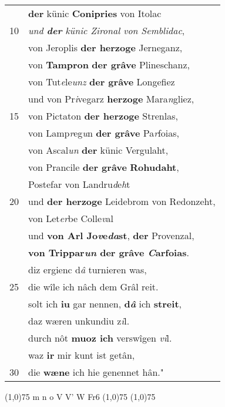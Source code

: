 \documentclass[8pt,a4paper,notitlepage]{article}
\begin{document}
\begin{table}[ht]
\begin{minipage}[t]{0.5\linewidth}
\begin{tabular}{rl}
 & \textbf{der} künic \textbf{Conipries} von Itolac\\ 
10 & \textit{und \textbf{der} künic Zironal von Semblidac},\\ 
 & von Jeroplis \textbf{der herzoge} Jerneganz,\\ 
 & von \textbf{Tampron} \textbf{der grâve} Plineschanz,\\ 
 & von Tut\textit{e}le\textit{unz} \textbf{der grâve} Longefiez\\ 
 & und von Pr\textit{i}vegarz \textbf{herzoge} Mara\textit{n}gliez,\\ 
15 & von Pictaton \textbf{der herzoge} Strenlas,\\ 
 & von Lamp\textit{r}eg\textit{u}n \textbf{der grâve} Pa\textit{r}foias,\\ 
 & von Ascal\textit{un} \textbf{der} künic Vergulaht,\\ 
 & von Prancile \textbf{der grâve} \textbf{Rohudaht},\\ 
 & Postefar von Landru\textit{d}e\textit{h}t\\ 
20 & und \textbf{der herzoge} Leidebrom von Redonzeht,\\ 
 & von Let\textit{er}be Colle\textit{v}al\\ 
 & und \textbf{von Arl Jo\textit{v}e\textit{da}st}, \textbf{der} Provenzal,\\ 
 & \textbf{von Trippar\textit{un} der grâve \textit{C}arfoias}.\\ 
 & diz ergienc d\textit{â} turnieren was,\\ 
25 & die wîle ich nâch dem Grâl reit.\\ 
 & solt ich \textbf{iu} gar nennen, \textbf{d\textit{â}} ich \textbf{streit},\\ 
 & daz wæren unkundiu z\textit{i}l.\\ 
 & durch nôt \textbf{muoz ich} verswîgen \textit{vi}l.\\ 
 & waz \textbf{ir} mir kunt ist getân,\\ 
30 & die \textbf{wæne} ich hie genennet hân."\\ 
\end{tabular}
\scriptsize
\line(1,0){75} \newline
m n o V V' W Fr6 \newline
\line(1,0){75} \newline
\newline
\line(1,0){75} \newline

\end{minipage}
\end{table}
\end{document}
